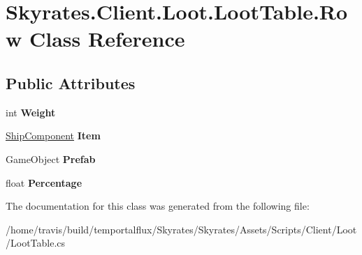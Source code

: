 \hypertarget{class_skyrates_1_1_client_1_1_loot_1_1_loot_table_1_1_row}{\section{Skyrates.\-Client.\-Loot.\-Loot\-Table.\-Row Class Reference}
\label{class_skyrates_1_1_client_1_1_loot_1_1_loot_table_1_1_row}
}
\subsection*{Public Attributes}
\begin{DoxyCompactItemize}
\item 
\hypertarget{class_skyrates_1_1_client_1_1_loot_1_1_loot_table_1_1_row_a37c7e8af6f77228bbc56ea49295d9c5d}{int {\bfseries Weight}}\label{class_skyrates_1_1_client_1_1_loot_1_1_loot_table_1_1_row_a37c7e8af6f77228bbc56ea49295d9c5d}

\item 
\hypertarget{class_skyrates_1_1_client_1_1_loot_1_1_loot_table_1_1_row_a029a405a7e04b52654cff5f0d4537ba8}{\hyperlink{class_skyrates_1_1_client_1_1_ship_1_1_ship_component}{Ship\-Component} {\bfseries Item}}\label{class_skyrates_1_1_client_1_1_loot_1_1_loot_table_1_1_row_a029a405a7e04b52654cff5f0d4537ba8}

\item 
\hypertarget{class_skyrates_1_1_client_1_1_loot_1_1_loot_table_1_1_row_a86f5cbda47cdcba332220e3d8031e6cb}{Game\-Object {\bfseries Prefab}}\label{class_skyrates_1_1_client_1_1_loot_1_1_loot_table_1_1_row_a86f5cbda47cdcba332220e3d8031e6cb}

\item 
\hypertarget{class_skyrates_1_1_client_1_1_loot_1_1_loot_table_1_1_row_a94033188f91d43c16658659a93df21aa}{float {\bfseries Percentage}}\label{class_skyrates_1_1_client_1_1_loot_1_1_loot_table_1_1_row_a94033188f91d43c16658659a93df21aa}

\end{DoxyCompactItemize}


The documentation for this class was generated from the following file\-:\begin{DoxyCompactItemize}
\item 
/home/travis/build/temportalflux/\-Skyrates/\-Skyrates/\-Assets/\-Scripts/\-Client/\-Loot/Loot\-Table.\-cs\end{DoxyCompactItemize}
